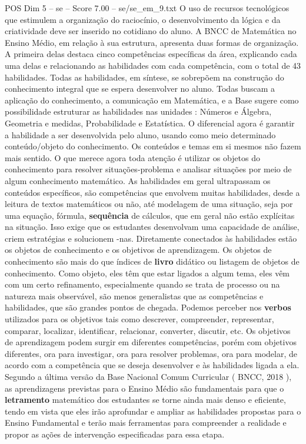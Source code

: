 \begin{textsample}{POS Dim 5 – se – Score 7.00 – se/se\_em\_9.txt}
O uso de recursos tecnológicos que estimulem a organização do raciocínio, o desenvolvimento da lógica e da criatividade deve ser inserido no cotidiano do aluno.
A BNCC de Matemática no Ensino Médio, em relação à sua estrutura, apresenta duas formas de organização.
A primeira delas destaca cinco competências específicas da área, explicando cada uma delas e relacionando as habilidades com cada competência, com o total de 43 habilidades.
Todas as habilidades, em síntese, se sobrepõem na construção do conhecimento integral que se espera desenvolver no aluno.
Todas buscam a aplicação do conhecimento, a comunicação em Matemática, e a Base sugere como possibilidade estruturar as habilidades nas unidades : Números e Álgebra, Geometria e medidas, Probabilidade e Estatística.
O diferencial agora é garantir a habilidade a ser desenvolvida pelo aluno, usando como meio determinado conteúdo/objeto do conhecimento.
Os conteúdos e temas em si mesmos não fazem mais sentido.
O que merece agora toda atenção é utilizar os objetos do conhecimento para resolver situações-problema e analisar situações por meio de algum conhecimento matemático.
As habilidades em geral ultrapassam os conteúdos específicos, são competências que envolvem muitas habilidades, desde a leitura de textos matemáticos ou não, até modelagem de uma situação, seja por uma equação, fórmula, \textbf{sequência} de cálculos, que em geral não estão explícitas na situação.
Isso exige que os estudantes desenvolvam uma capacidade de análise, criem estratégias e solucionem -nas.
Diretamente conectados às habilidades estão os objetos de conhecimento e os objetivos de aprendizagem.
Os objetos de conhecimento são mais do que índices de \textbf{livro} didático ou listagem de objetos de conhecimento.
Como objeto, eles têm que estar ligados a algum tema, eles vêm com um certo refinamento, especialmente quando se trata de processo ou na natureza mais observável, são menos generalistas que as competências e habilidades, que são grandes pontos de chegada.
Podemos perceber nos \textbf{verbos} utilizados para os objetivos tais como descrever, compreender, representar, comparar, localizar, identificar, relacionar, converter, discutir, etc.
Os objetivos de aprendizagem podem surgir em diferentes competências, porém com objetivos diferentes, ora para investigar, ora para resolver problemas, ora para modelar, de acordo com a competência que se deseja desenvolver e às habilidades ligada a ela.
Segundo a última versão da Base Nacional Comum Curricular ( BNCC, 2018 ), as aprendizagens previstas para o Ensino Médio são fundamentais para que o \textbf{letramento} matemático dos estudantes se torne ainda mais denso e eficiente, tendo em vista que eles irão aprofundar e ampliar as habilidades propostas para o Ensino Fundamental e terão mais ferramentas para compreender a realidade e propor as ações de intervenção especificadas para essa etapa.

\end{textsample}
